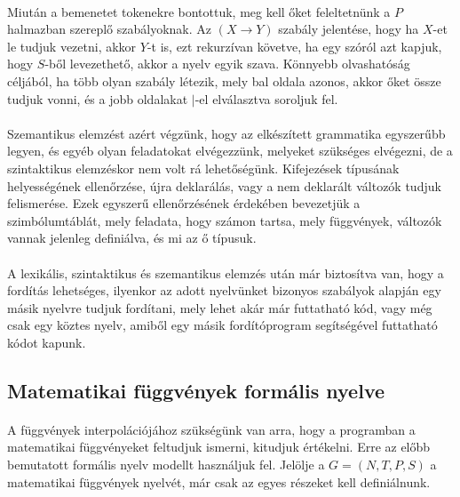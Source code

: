 \documentclass{elteikthesis}
\begin{document}
\paragraph{}
Miután a bemenetet tokenekre bontottuk, meg kell őket feleltetnünk a $P$ halmazban szereplő szabályoknak. Az $(X \rightarrow Y)$ szabály jelentése, hogy ha $X$-et le tudjuk vezetni, akkor $Y$-t is, ezt rekurzívan követve, ha egy szóról azt kapjuk, hogy $S$-ből levezethető, akkor a nyelv egyik szava. Könnyebb olvashatóság céljából, ha több olyan szabály létezik, mely bal oldala azonos, akkor őket össze tudjuk vonni, és a jobb oldalakat $|$-el elválasztva soroljuk fel.
\paragraph{}
Szemantikus elemzést azért végzünk, hogy az elkészített grammatika egyszerűbb legyen, és egyéb olyan feladatokat elvégezzünk, melyeket szükséges elvégezni, de a szintaktikus elemzéskor nem volt rá lehetőségünk. Kifejezések típusának helyességének ellenőrzése, újra deklarálás, vagy a nem deklarált változók tudjuk felismerése. Ezek egyszerű ellenőrzésének érdekében bevezetjük a szimbólumtáblát, mely feladata, hogy számon tartsa, mely függvények, változók vannak jelenleg definiálva, és mi az ő típusuk.
\paragraph{}
A lexikális, szintaktikus és szemantikus elemzés után már biztosítva van, hogy a fordítás lehetséges, ilyenkor az adott nyelvünket bizonyos szabályok alapján egy másik nyelvre tudjuk fordítani, mely lehet akár már futtatható kód, vagy még csak egy köztes nyelv, amiből egy másik fordítóprogram segítségével futtatható kódot kapunk.
\subsection{Matematikai függvények formális nyelve}
\paragraph{}
A függvények interpolációjához szükségünk van arra, hogy a programban a matematikai függvényeket feltudjuk ismerni, kitudjuk értékelni. Erre az előbb bemutatott formális nyelv modellt használjuk fel. Jelölje a $G=(N, T, P, S)$ a matematikai függvények nyelvét, már csak az egyes részeket kell definiálnunk.
\end{document}
